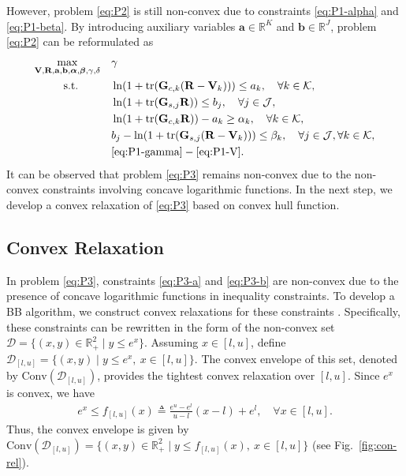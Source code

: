 \documentclass[runningheads]{llncs}
\begin{document}
However, problem \eqref{eq:P2} is still non-convex due to constraints \eqref{eq:P1-alpha} and \eqref{eq:P1-beta}. By introducing auxiliary variables $\mathbf{a} \in \mathbb{R}^K$ and $\mathbf{b} \in \mathbb{R}^{J}$, problem \eqref{eq:P2} can be reformulated as
\begin{subequations}
\label{eq:P3}
\begin{align}
\max_{\mathbf{V}, \mathbf{R}, \mathbf{a}, \mathbf{b}, \boldsymbol{\alpha}, \boldsymbol{\beta}, \gamma, \delta} \quad 
& \gamma \\
\text{s.t.} \quad\quad\quad
& \ln\!\left(1 + \mathrm{tr}(\mathbf{G}_{c,k} (\mathbf{R} - \mathbf{V}_k)) \right) \le a_k , \quad \forall k \in \mathcal{K}, \label{eq:P3-a} \\
& \ln\!\left(1 + \mathrm{tr}(\mathbf{G}_{s,j} \mathbf{R}) \right) \le b_{j}, \quad \forall j \in \mathcal{J}, \label{eq:P3-b} \\
& \ln\!\left(1 + \mathrm{tr}(\mathbf{G}_{c,k} \mathbf{R}) \right) - a_k \ge \alpha_k , \quad \forall k \in \mathcal{K}, \label{eq:P3-alpha} \\
& b_{j} - \ln\!\left(1 + \mathrm{tr}(\mathbf{G}_{s,j} (\mathbf{R} - \mathbf{V}_k)) \right) \le \beta_k, \quad \forall j \in \mathcal{J}, \forall k \in \mathcal{K}, \label{eq:P3-beta} \\
& \eqref{eq:P1-gamma} - \eqref{eq:P1-V}.
\end{align}
\end{subequations}
It can be observed that problem \eqref{eq:P3} remains non-convex due to the non-convex constraints involving concave logarithmic functions. In the next step, we develop a convex relaxation of \eqref{eq:P3} based on convex hull function.

\subsection{Convex Relaxation}

In problem \eqref{eq:P3}, constraints \eqref{eq:P3-a} and \eqref{eq:P3-b} are non-convex due to the presence of concave logarithmic functions in inequality constraints. To develop a BB algorithm, we construct convex relaxations for these constraints \cite{tuy1998convex}. Specifically, these constraints can be rewritten in the form of the non-convex set $\mathcal{D} = \{(x, y) \in \mathbb{R}_+^2 \mid y \le e^x \}$.
Assuming $x \in [l,u]$, define $\mathcal{D}_{[l,u]} = \{(x,y) \mid y \le e^x, \ x \in [l,u] \}$. The convex envelope of this set, denoted by $\mathrm{Conv}(\mathcal{D}_{[l,u]})$, provides the tightest convex relaxation over $[l,u]$. Since $e^x$ is convex, we have
\begin{align}
e^x \le f_{[l,u]}(x) \triangleq \frac{e^u - e^l}{u - l}(x - l) + e^l, \quad \forall x \in [l,u].
\end{align}
Thus, the convex envelope is given by $\mathrm{Conv}(\mathcal{D}_{[l,u]}) = \{(x,y) \in \mathbb{R}_+^2 \mid y \le f_{[l,u]}(x), \ x \in [l,u]\}$ (see Fig.~\ref{fig:con-rel}).
\end{document}
